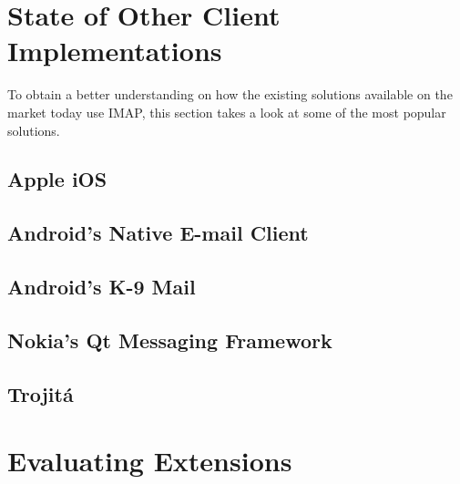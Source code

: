 \documentclass[trojita]{subfiles}
\begin{document}
\section{State of Other Client Implementations}

To obtain a better understanding on how the existing solutions available on the market today use IMAP, this section
takes a look at some of the most popular solutions.


\subsection{Apple iOS}

\subsection{Android's Native E-mail Client}

\subsection{Android's K-9 Mail}

\subsection{Nokia's Qt Messaging Framework}

\subsection{Trojitá}

\section{Evaluating Extensions}
\end{document}
